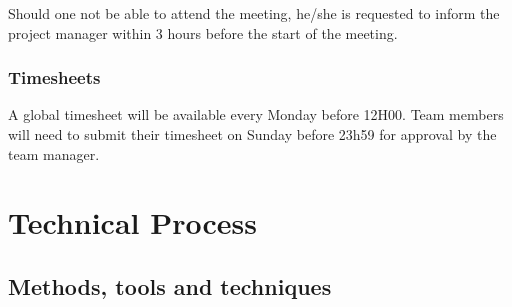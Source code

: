 \documentclass[a4paper, 12pt]{report}
\begin{document}
			Should one not be able to attend the meeting, he/she is requested to inform
			the project manager within 3 hours before the start of the meeting.
			
			\subsection{Timesheets}
			A global timesheet will be available every Monday before 12H00. Team 
			members will need to submit their timesheet on Sunday before 23h59
			for approval by the team manager.
			
	\chapter{Technical Process}
	
			\section{Methods, tools and techniques}
			
\end{document}
